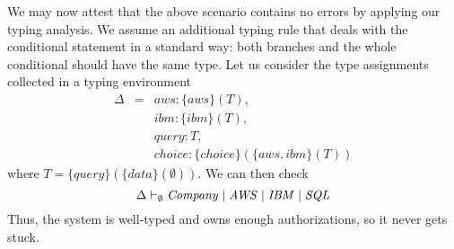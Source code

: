We may now attest that the above scenario contains no errors by applying our typing analysis. %
We assume an additional typing rule that deals with the conditional statement
in a standard way: both branches  and the whole conditional should have the same type. Let us consider the type assignments collected in a typing environment
%
$$
\begin{array}{lll}
\Delta & = & 
 \mathit{aws}:\{\mathit{aws}\}(T),\\
& & \mathit{ibm}:\{\mathit{ibm}\}(T), \\
& & \mathit{query}: T,\\
& & \mathit{choice}:\{\mathit{choice}\}(\{\mathit{aws}, \mathit{ibm}\}(T))
\end{array}
$$
%
where $T=\{\mathit{query}\}(\{\mathit{data}\}(\emptyset))$.
We can then check  
%
$$\Delta \vdash_\emptyset \mathit{Company} \;|\; \mathit{AWS} \;|\; \mathit{IBM} \;|\; \mathit{SQL}$$
%
Thus, the system is well-typed and owns enough authorizations, so it never gets stuck.

